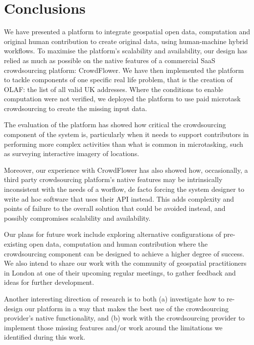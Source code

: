 \section{Conclusions}

We have presented a platform to integrate geospatial open data, computation and original human contribution to create original data, using human-machine hybrid workflows. To maximise the platform's scalability and availability, our design has relied as much as possible on the native features of a commercial SaaS crowdsourcing platform: CrowdFlower. We have then implemented the platform to tackle components of one specific real life problem, that is the creation of OLAF: the list of all valid UK addresses. Where the conditions to enable computation were not verified, we deployed the platform to use paid microtask crowdsourcing to create the missing input data.

The evaluation of the platform has showed how critical the crowdsourcing component of the system is, particularly when it needs to support contributors in performing more complex activities than what is common in microtasking, such as surveying interactive imagery of locations. 

Moreover, our experience with CrowdFlower has also showed how, occasionally, a third party crowdsourcing platform's native features may be intrinsically inconsistent with the needs of a worflow, de facto forcing the system designer to write ad hoc software that uses their API instead. This adds complexity and points of failure to the overall solution that could be avoided instead, and possibly compromises scalability and availability. 

Our plans for future work include exploring alternative configurations of pre-existing open data, computation and human contribution where the crowdsourcing component can be designed to achieve a higher degree of success. We also intend to share our work with the community of geospatial practitioners in London at one of their upcoming regular meetings, to gather feedback and ideas for further development.

Another interesting direction of research is to both (a) investigate how to re-design our platform in a way that makes the best use of the crowdsourcing provider's native functionality, and (b) work with the crowdsourcing provider to implement those missing features and/or work around the limitations we identified during this work.
